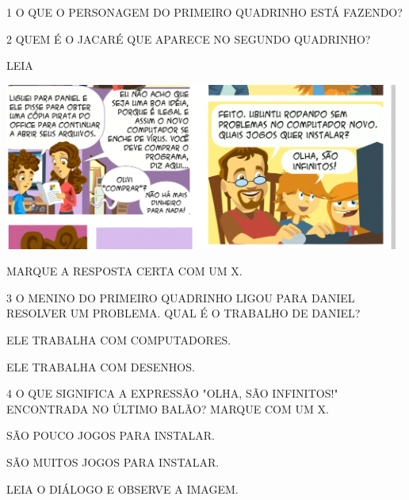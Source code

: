 \num{1} O QUE O PERSONAGEM DO PRIMEIRO QUADRINHO ESTÁ FAZENDO?


\num{2} QUEM É O JACARÉ QUE APARECE NO SEGUNDO QUADRINHO?


LEIA

\includegraphics[width=5.11873in,height=2.15447in]{media/image172.png}


MARQUE A RESPOSTA CERTA COM UM X.

\num{3} O MENINO DO PRIMEIRO QUADRINHO LIGOU PARA DANIEL RESOLVER UM PROBLEMA. QUAL É O TRABALHO DE DANIEL?

\begin{boxlist}
\boxitem[\rosa{X}] ELE TRABALHA COM COMPUTADORES.

\boxitem[] ELE TRABALHA COM DESENHOS.
\end{boxlist}

\num{4} O QUE SIGNIFICA A EXPRESSÃO "OLHA, SÃO INFINITOS!" ENCONTRADA NO ÚLTIMO BALÃO? MARQUE COM UM X.

\begin{boxlist}
\boxitem[] SÃO POUCO JOGOS PARA INSTALAR.

\boxitem[\rosa{X}] SÃO MUITOS JOGOS PARA INSTALAR.
\end{boxlist}

LEIA O DIÁLOGO E OBSERVE A IMAGEM.



